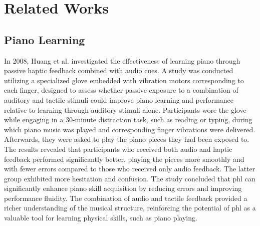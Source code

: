 \section{Related Works}
\subsection{Piano Learning}
In 2008, Huang et al. \cite{Huang2008} investigated the effectiveness of learning piano through passive haptic feedback combined with audio cues. A study was conducted utilizing a specialized glove embedded with vibration motors corresponding to each finger, designed to assess whether passive exposure to a combination of auditory and tactile stimuli could improve piano learning and performance relative to learning through auditory stimuli alone. Participants wore the glove while engaging in a 30-minute distraction task, such as reading or typing, during which piano music was played and corresponding finger vibrations were delivered. Afterwards, they were asked to play the piano pieces they had been exposed to. The results revealed that participants who received both audio and haptic feedback performed significantly better, playing the pieces more smoothly and with fewer errors compared to those who received only audio feedback. The latter group exhibited more hesitation and confusion. The study concluded that \gls{phl} can significantly enhance piano skill acquisition by reducing errors and improving performance fluidity. The combination of audio and tactile feedback provided a richer understanding of the musical structure, reinforcing the potential of \gls{phl} as a valuable tool for learning physical skills, such as piano playing.

